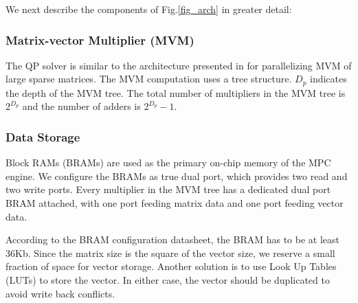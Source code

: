 We next describe the components of Fig.\cref{fig_arch} in greater detail:
\subsubsection{Matrix-vector Multiplier (MVM)}
The QP solver is similar to the architecture presented in\cite{Zhuo:2005:SMM:1046192.1046202} for parallelizing MVM of large sparse matrices. The MVM computation uses a tree structure. $D_p$ indicates the depth of the MVM tree. The total number of multipliers in the MVM tree is $2^{D_p}$ and the number of adders is $2^{D_p}-1$.

\subsubsection{Data Storage}
Block RAMs (BRAMs) are used as the primary on-chip memory of the MPC engine. We configure the BRAMs as true dual port, which provides two read and two write ports. Every multiplier in the MVM tree has a dedicated dual port BRAM attached, with one port feeding matrix data and one port feeding vector data.\par

According to the BRAM configuration datasheet, the BRAM has to be at least 36Kb. Since the matrix size is the square of the vector size, we reserve a small fraction of space for vector storage. Another solution is to use Look Up Tables (LUTs) to store the vector. In either case, the vector should be duplicated to avoid write back conflicts.\par
%
%

